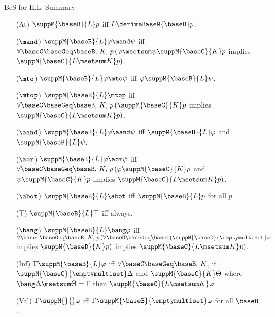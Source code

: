 \documentclass{beamer}
\begin{document}
\begin{frame}{BeS for ILL: Summary}
	\begin{itemize}
	\item[(At)] $\suppM{\baseB}{L}p$ iff $L\deriveBaseM{\baseB}p$.
	\item[($\mand$)] $\suppM{\baseB}{L}\varphi\mand\psi$ iff $\forall\baseC\baseGeq\baseB,\, K,\,p\, (\varphi\msetsum\psi\suppM{\baseC}{K}p$ implies $\suppM{\baseC}{L\msetsum K}p)$.
	\item[($\mto$)] $\suppM{\baseB}{L}\varphi\mto\psi$ iff $\varphi\suppM{\baseB}{L}\psi$.
	\item[($\mtop$)] $\suppM{\baseB}{L}\mtop$ iff $\forall\baseC\baseGeq\baseB,\, K,\,p\, (\suppM{\baseC}{K}p$ implies $\suppM{\baseC}{L\msetsum K}p)$.
	\item[($\aand$)] $\suppM{\baseB}{L}\varphi\aand\psi$ iff $\suppM{\baseB}{L}\varphi$ and $\suppM{\baseB}{L}\psi$.
	\item[($\aor$)] $\suppM{\baseB}{L}\varphi\aor\psi$ iff $\forall\baseC\baseGeq\baseB,\, K,\,p\, (\varphi\suppM{\baseC}{K}p$ and $\psi\suppM{\baseC}{K}p$ implies $\suppM{\baseC}{L\msetsum K}p)$.
	\item[($\abot$)] $\suppM{\baseB}{L}\abot$ iff $\suppM{\baseB}{L}p$ for all $p$.
	\item[($\top$)] $\suppM{\baseB}{L}\top$ iff always.
	\item[($\bang$)] $\suppM{\baseB}{L}\bang\varphi$ iff \newline $\forall\baseC\baseGeq\baseB,\, K,\,p\, (\forall\baseD\baseGeq\baseC(\suppM{\baseD}{\emptymultiset}\varphi$ implies $\suppM{\baseD}{K}p)$ implies $\suppM{\baseC}{L\msetsum K}p)$.
	\item[(Inf)] $\Gamma\suppM{\baseB}{L}\varphi$ iff \newline $\forall\baseC\baseGeq\baseB,\, K$, if $\suppM{\baseC}{\emptymultiset}\Delta$ and $\suppM{\baseC}{K}\Theta$ where $\bang\Delta\msetsum\Theta = \Gamma$ then $\suppM{\baseC}{L\msetsum K}\varphi$
	\item[(Val)] $\Gamma\suppM{}{}\varphi$ iff $\Gamma\suppM{\baseB}{\emptymultiset}\varphi$ for all $\baseB$.
	\end{itemize}
\end{frame}
\end{document}
